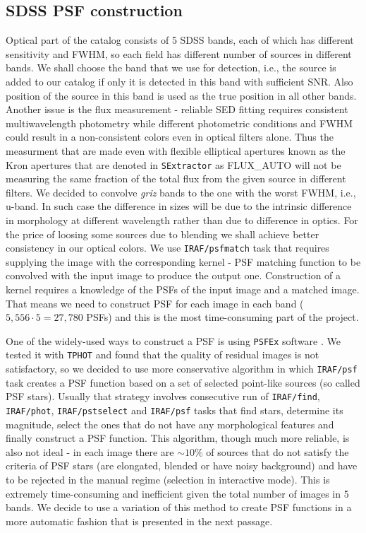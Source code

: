 \subsection{SDSS PSF construction}
	Optical part of the catalog consists of 5 SDSS bands, each of which has different sensitivity and FWHM, so each field has different number of sources in different bands. We shall choose the band that we use for detection, i.e., the source is added to our catalog if only it is detected in this band with sufficient SNR. Also position of the source in this band is used as the true position in all other bands. Another issue is the flux measurement - reliable SED fitting requires consistent multiwavelength photometry while different photometric conditions and FWHM could result in a non-consistent colors even in optical filters alone. Thus the measurment that are made even with flexible elliptical apertures known as the Kron apertures \citep{Kron1980} that are denoted  in {\tt SExtractor} as FLUX\_AUTO \citep{Bertin1996} will not be measuring the same fraction of the total flux from the given source in different filters. We decided to convolve \textit{griz} bands to the one with the worst FWHM, i.e., u-band. In such case the difference in sizes will be due to the intrinsic difference in morphology at different wavelength rather than due to difference in optics. For the price of loosing some sources due to blending we shall achieve better consistency in our optical colors. We use {\tt IRAF/psfmatch} task that requires supplying the image with the corresponding kernel - PSF matching function to be convolved with the input image to produce the output one. Construction of a kernel requires a knowledge of the PSFs of the input image and a matched image. That means we need to construct PSF for each image in each band ($5,556\cdot 5 = 27,780$ PSFs) and this is the most time-consuming part of the project.

One of the widely-used ways to construct a PSF is using {\tt PSFEx} software \citep{Bertin2011}. We tested it with {\tt TPHOT} and found that the quality of residual images is not satisfactory, so we decided to use more conservative algorithm in which {\tt IRAF/psf} task creates a PSF function based on a set of selected point-like sources (so called PSF stars). Usually that strategy involves consecutive run of {\tt IRAF/find}, {\tt IRAF/phot}, {\tt IRAF/pstselect} and {\tt IRAF/psf} tasks that find stars, determine its magnitude, select the ones that do not have any morphological features and finally construct a PSF function. This algorithm, though much more reliable, is also not ideal - in each image there are $\sim 10\% $ of sources that do not satisfy the criteria of PSF stars (are elongated, blended or have noisy background) and have to be rejected in the manual regime (selection in interactive mode). This is extremely time-consuming and inefficient given the total number of images in 5 bands. We decide to use a variation of this method to create PSF functions in a more automatic fashion that is presented in the next passage. 

